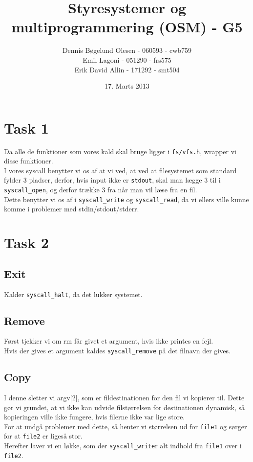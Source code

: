 \documentclass[a4paper,12pt]{article}
\title{Styresystemer og multiprogrammering (OSM) - G5}
\author{Dennis Bøgelund Olesen - 060593 - cwb759 \\ Emil Lagoni - 051290 - frs575 \\ Erik David Allin - 171292 - smt504}
\date{17. Marts 2013}
\begin{document}
\maketitle %
\thispagestyle{empty}
\setcounter{page}{0}
\newpage

\section*{Task 1}
Da alle de funktioner som vores kald skal bruge ligger i \texttt{fs/vfs.h}, wrapper vi disse funktioner.
\\
I vores syscall benytter vi os af at vi ved, at ved at filesystemet som standard fylder 3 pladser, derfor, hvis input ikke er \texttt{stdout}, skal man lægge 3 til i \texttt{syscall\_open}, og derfor trække 3 fra når man vil læse fra en fil. 
\\
Dette benytter vi os af i \texttt{syscall\_write} og \texttt{syscall\_read}, da vi ellers ville kunne komme i problemer med stdin/stdout/stderr.


\section*{Task 2}

\subsection*{Exit}
Kalder \texttt{syscall\_halt}, da det lukker systemet.

\subsection*{Remove}
Først tjekker vi om rm får givet et argument, hvis ikke printes en fejl. \\
Hvis der gives et argument kaldes \texttt{syscall\_remove} på det filnavn der gives.


\subsection*{Copy}
I denne sletter vi argv[2], som er fildestinationen for den fil vi kopierer til. Dette gør vi grundet, at vi ikke kan udvide filstørrelsen for destinationen dynamisk, så kopieringen ville ikke fungere, hvis filerne ikke var lige store.
\\
For at undgå problemer med dette, så henter vi størrelsen ud for \texttt{file1} og sørger for at \texttt{file2} er ligeså stor.
\\
Herefter laver vi en løkke, som der \texttt{syscall\_write}r alt indhold fra \texttt{file1} over i \texttt{file2}.
\end{document}
